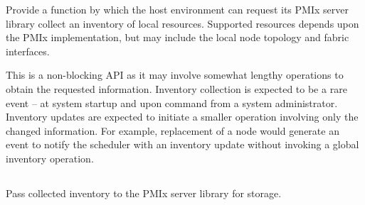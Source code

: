 \begin{arglist}
\end{arglist}

\returnsimplenb

\descr

Provide a function by which the host environment can request its \ac{PMIx} server library collect an inventory of local resources. Supported resources depends upon the \ac{PMIx} implementation, but may include the local node topology and fabric interfaces.

\advicermstart
This is a non-blocking \ac{API} as it may involve somewhat lengthy operations to obtain the requested information. Inventory collection is expected to be a rare event – at system startup and upon command from a system administrator. Inventory updates are expected to initiate a smaller operation involving only the changed information. For example, replacement of a node would generate an event to notify the scheduler with an inventory update without invoking a global inventory operation.
\advicermend

\subsection{}

\summary

Pass collected inventory to the \ac{PMIx} server library for storage.

\format


